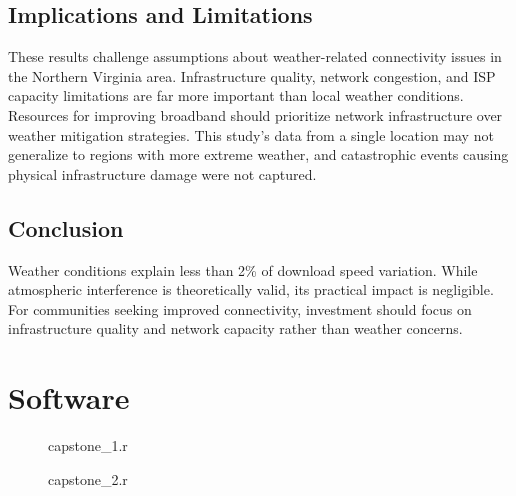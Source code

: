 \documentclass[11pt]{report}
\begin{document}
\section{Implications and Limitations}

These results challenge assumptions about weather-related connectivity issues in the Northern Virginia area. Infrastructure quality, network congestion, and ISP capacity limitations are far more important than local weather conditions. Resources for improving broadband should prioritize network infrastructure over weather mitigation strategies. This study's data from a single location may not generalize to regions with more extreme weather, and catastrophic events causing physical infrastructure damage were not captured.

\section{Conclusion}

Weather conditions explain less than 2\% of download speed variation. While atmospheric interference is theoretically valid, its practical impact is negligible. For communities seeking improved connectivity, investment should focus on infrastructure quality and network capacity rather than weather concerns.

\appendix
\appendixeqnumbering
%

\chapter{Software} 

\begin{figure}[ht!]
    \begin{boxedminipage}[tb]{\columnwidth}
        \small
        \internallinenumbers
        \resetlinenumber[1]
        
    \end{boxedminipage}
    \caption{capstone\_1.r}
    \label{fig:capstone_1.r}
\end{figure}

\begin{figure}[p]
    \begin{boxedminipage}[tb]{\columnwidth}
        \internallinenumbers
        \resetlinenumber[1]
        
    \end{boxedminipage}
    \caption{capstone\_2.r}
    \label{fig:capstone_2.r}
\end{figure}
\end{document}
